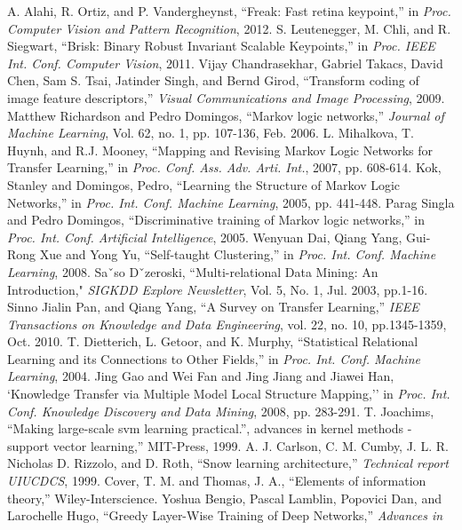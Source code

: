 \documentclass{tADR2e}
\begin{document}
\begin{thebibliography}{12}
 A. Alahi, R. Ortiz, and P. Vandergheynst, ``Freak: Fast retina keypoint,'' in \textit{Proc. Computer Vision and Pattern Recognition}, 2012.
 S. Leutenegger, M. Chli, and R. Siegwart, ``Brisk: Binary Robust Invariant Scalable Keypoints,'' in \textit{Proc. IEEE Int. Conf. Computer Vision}, 2011.
 Vijay Chandrasekhar, Gabriel Takacs, David Chen, Sam S. Tsai, Jatinder Singh, and Bernd Girod, ``Transform coding of image feature descriptors,'' \textit{Visual Communications and Image Processing}, 2009.
 Matthew Richardson and Pedro Domingos, ``Markov logic networks,'' \textit{Journal of Machine Learning}, Vol. 62, no. 1, pp. 107-136, Feb. 2006.
 L. Mihalkova, T. Huynh, and R.J. Mooney, ``Mapping and Revising Markov Logic Networks for Transfer Learning,'' in \textit{Proc. Conf. Ass. Adv. Arti. Int.}, 2007, pp. 608-614.
 Kok, Stanley and Domingos, Pedro, ``Learning the Structure of Markov Logic Networks,'' in \textit{Proc. Int. Conf. Machine Learning}, 2005, pp. 441-448.
 Parag Singla and Pedro Domingos, ``Discriminative training of Markov logic networks,'' in \textit{Proc. Int. Conf. Artiﬁcial Intelligence}, 2005.
 Wenyuan Dai, Qiang Yang, Gui-Rong Xue and Yong Yu, ``Self-taught Clustering,''  in \textit{Proc. Int. Conf. Machine Learning}, 2008.
 Saˇso Dˇzeroski, ``Multi-relational Data Mining: An Introduction," \textit{SIGKDD Explore Newsletter}, Vol. 5, No. 1, Jul. 2003, pp.1-16.
 Sinno Jialin Pan, and Qiang Yang, ``A Survey on Transfer Learning,'' \textit{IEEE Transactions on Knowledge and Data Engineering}, vol. 22, no. 10, pp.1345-1359, Oct. 2010.
 T. Dietterich, L. Getoor, and K. Murphy, ``Statistical Relational Learning and its Connections to Other Fields,'' in \textit{Proc. Int. Conf. Machine Learning}, 2004.
 Jing Gao and Wei Fan and Jing Jiang and Jiawei Han, `Knowledge Transfer via Multiple Model Local Structure Mapping,'' in \textit{Proc. Int. Conf. Knowledge Discovery and Data Mining}, 2008, pp. 283-291.
 T. Joachims, ``Making large-scale svm learning practical.”, advances in kernel methods - support vector learning,'' MIT-Press, 1999.
 A. J. Carlson, C. M. Cumby, J. L. R. Nicholas D. Rizzolo, and D. Roth, ``Snow learning architecture,'' \textit{Technical report UIUCDCS}, 1999.
 Cover, T. M. and Thomas, J. A., ``Elements of information theory,'' Wiley-Interscience.
 Yoshua Bengio, Pascal Lamblin, Popovici Dan, and Larochelle Hugo, ``Greedy Layer-Wise Training of Deep Networks,'' \textit{Advances in
}
\end{thebibliography}
\end{document}
